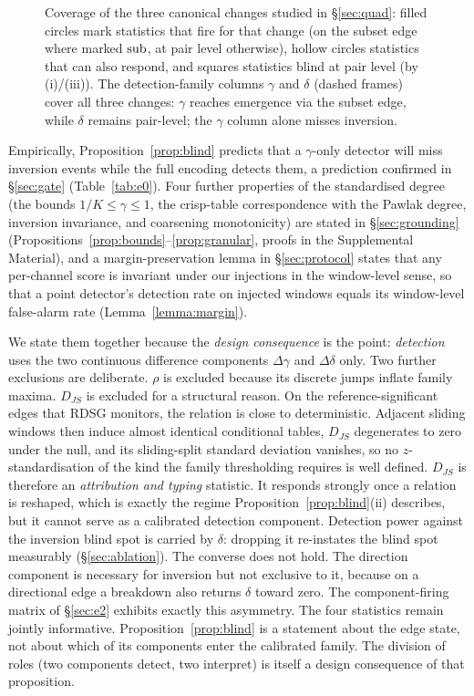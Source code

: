 \documentclass[11pt,a4paper]{article}
\newcommand{\RDSG}{RDSG}
\begin{document}
\begin{figure}[t]\centering\caption{Coverage of the three canonical changes studied in \S\ref{sec:quad}: filled circles mark statistics that fire for that
change (on the subset edge where marked ${\rm sub}$, at pair level
otherwise), hollow circles statistics that can also respond, and squares
statistics blind at pair level (by (i)/(iii)). The detection-family columns
$\gamma$ and $\delta$ (dashed frames) cover all three changes:
$\gamma$ reaches emergence via the subset edge, while $\delta$
remains pair-level; the $\gamma$ column alone misses
inversion.}\label{fig:coverage}\end{figure}

Empirically, Proposition~\ref{prop:blind} predicts that a
$\gamma$-only detector will miss inversion events while the full
encoding detects them, a prediction confirmed in §\ref{sec:gate}
(Table~\ref{tab:e0}). Four further properties of the standardised
degree (the bounds $1/K\le\gamma\le1$, the crisp-table correspondence
with the Pawlak degree, inversion invariance, and coarsening
monotonicity) are stated in §\ref{sec:grounding}
(Propositions~\ref{prop:bounds}--\ref{prop:granular}, proofs in the
Supplemental Material), and a margin-preservation lemma in
§\ref{sec:protocol} states that any per-channel score is invariant under
our injections in the window-level sense, so that a point detector's
detection rate on injected windows equals its window-level false-alarm
rate (Lemma~\ref{lemma:margin}).

We state them together because the \emph{design
consequence} is the point: \emph{detection} uses the two continuous
difference components $\Delta\gamma$ and $\Delta\delta$ only. Two further
exclusions are deliberate. $\rho$ is excluded because its discrete jumps
inflate family maxima. $D_{JS}$ is excluded for a structural reason. On
the reference-significant edges that \RDSG{} monitors, the relation is
close to deterministic. Adjacent sliding windows then induce almost
identical conditional tables, $D_{JS}$ degenerates to zero under the null,
and its sliding-split standard deviation vanishes, so no $z$-standardisation
of the kind the family thresholding requires is well defined. $D_{JS}$ is
therefore an \emph{attribution and typing} statistic. It responds
strongly once a relation is reshaped, which is exactly the regime
Proposition~\ref{prop:blind}(ii) describes, but it cannot serve as a
calibrated detection component. Detection power against the inversion
blind spot is carried by $\delta$: dropping it re-instates the blind spot
measurably (\S\ref{sec:ablation}). The converse does not
hold. The direction component is necessary for inversion but not
exclusive to it, because on a directional edge a breakdown also returns
$\delta$ toward zero. The component-firing matrix of \S\ref{sec:e2}
exhibits exactly this asymmetry. The four statistics remain jointly
informative. Proposition~\ref{prop:blind} is a statement about the edge
state, not about which of its components enter the calibrated family. The
division of roles (two components detect, two interpret) is itself a design
consequence of that proposition.
\end{document}
